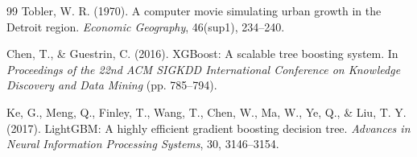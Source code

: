 \documentclass[11pt,a4paper,titlepage]{article}
\begin{document}
\begin{thebibliography}{99}
Tobler, W. R. (1970). A computer movie simulating urban growth in the Detroit region. \textit{Economic Geography}, 46(sup1), 234--240.

Chen, T., \& Guestrin, C. (2016). XGBoost: A scalable tree boosting system. In \textit{Proceedings of the 22nd ACM SIGKDD International Conference on Knowledge Discovery and Data Mining} (pp. 785--794).

Ke, G., Meng, Q., Finley, T., Wang, T., Chen, W., Ma, W., Ye, Q., \& Liu, T. Y. (2017). LightGBM: A highly efficient gradient boosting decision tree. \textit{Advances in Neural Information Processing Systems}, 30, 3146--3154.

\end{thebibliography}
\end{document}
